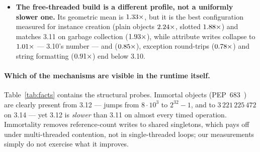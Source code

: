 \begin{itemize}[leftmargin=1.4em,itemsep=1pt]
  \item \textbf{The free-threaded build is a different profile, not a uniformly slower one.}
        Its geometric mean is $\meas{geomean:b3_runtime-v310|b3_runtime-v314t}{1.33}\times$, but it is the best configuration measured for
        instance creation (plain objects $\meas{ratio:b3_runtime-v310:create_plain_obj/v310|b3_runtime-v314t:create_plain_obj/v314t}{2.24}\times$, slotted $\meas{ratio:b3_runtime-v310:create_slots_obj/v310|b3_runtime-v314t:create_slots_obj/v314t}{1.88}\times$) and matches 3.11 on
        garbage collection ($\meas{ratio:b3_runtime-v310:gc_collect_100k_cycles/v310|b3_runtime-v314t:gc_collect_100k_cycles/v314t}{1.93}\times$), while attribute writes collapse to $\meas{ratio:b3_runtime-v310:attr_set/v310|b3_runtime-v314t:attr_set/v314t}{1.01}\times$ ---
        3.10's number --- and  ($\meas{ratio:b3_runtime-v310:list_append/v310|b3_runtime-v314t:list_append/v314t}{0.85}\times$), exception round-trips
        ($\meas{ratio:b3_runtime-v310:exception_roundtrip/v310|b3_runtime-v314t:exception_roundtrip/v314t}{0.78}\times$) and string formatting ($\meas{ratio:b3_runtime-v310:str_format_join/v310|b3_runtime-v314t:str_format_join/v314t}{0.91}\times$) end below 3.10.
\end{itemize}

\paragraph{Which of the mechanisms are visible in the runtime itself.}
Table~\ref{tab:facts} contains the structural probes. Immortal objects
(PEP~683~\cite{pep683}) are clearly present from 3.12 ---  jumps from
$8\cdot10^3$ to $2^{32}{-}1$, and to $3\,221\,225\,472$ on 3.14 --- yet 3.12 is \emph{slower}
than 3.11 on almost every timed operation. Immortality removes reference-count writes to shared
singletons, which pays off under multi-threaded contention, not in single-threaded loops; our
measurements simply do not exercise what it improves.

